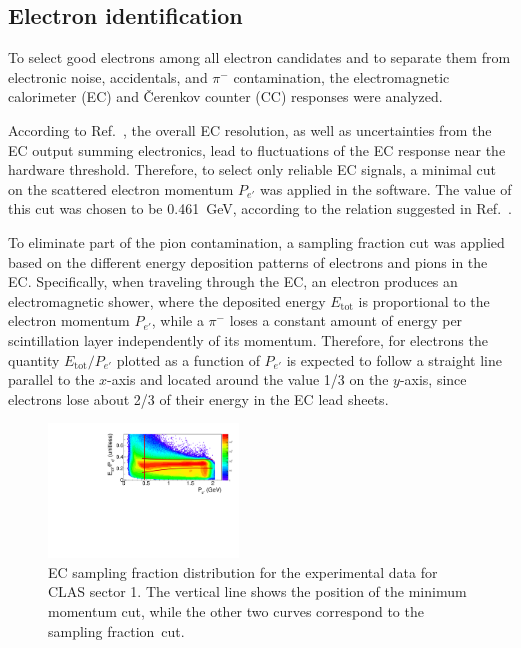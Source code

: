 \documentclass[prc,twocolumn,superscriptaddress,showpacs,amssymb,amsmath,amsfonts,aps,nofootinbib]{revtex4-1}
\begin{document}
\subsection{Electron identification}

To select good electrons among all electron candidates and to separate them from electronic noise, accidentals, and $\pi^{-}$ contamination, the electromagnetic calorimeter (EC) and \v Cerenkov counter (CC) responses were analyzed.

According to Ref.\!~\cite{Egian:007}, the overall EC resolution, as well as uncertainties from the EC output summing electronics, lead to fluctuations of the EC response near the hardware threshold. Therefore, to select only reliable EC signals, a minimal cut on the scattered electron momentum $P_{e'}$ was applied in the software. The value of this cut was chosen to be 0.461~GeV, according to the relation suggested in Ref.\!~\cite{Egian:007}.

To eliminate part of the pion contamination, a sampling fraction cut was applied based on the different energy deposition patterns of electrons and pions in the EC. Specifically, when traveling through the EC, an electron produces an electromagnetic shower, where the deposited energy $E_{\text{tot}}$ is proportional to the electron momentum $P_{e'}$, while a $\pi^{-}$ loses a constant amount of energy per scintillation layer independently of its momentum. Therefore, for electrons the quantity $E_{\text{tot}}/P_{e'}$ plotted as a function of $P_{e'}$ is expected to follow a straight line parallel to the $x$-axis and located around the value 1/3 on the $y$-axis, since electrons lose about 2/3 of their energy in the EC lead sheets.


\begin{figure}[htp]
\begin{center}
 \includegraphics[width=0.45\textwidth,keepaspectratio]{pictures/event_selection/ectot.pdf}
\vspace{-0.1cm}
\caption{EC sampling fraction distribution for the experimental data for CLAS sector 1. The vertical line shows the position of the minimum momentum cut, while the other two curves correspond to the sampling fraction~cut.}
\label{fig:ec_cut}
\end{center}
\end{figure}
\end{document}
